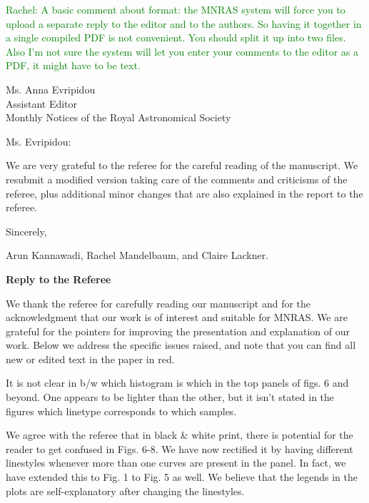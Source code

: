 \documentclass[english]{letter}
\newcommand{\rachel}[1]{\textrm{\textcolor{green}{Rachel: #1}}}
\begin{document}
\date{\today}

\rachel{A basic comment about format: the MNRAS system will force you to upload a separate reply to
  the editor and to the authors.  So having it together in a single compiled PDF is not convenient.
  You should split it up into two files.  Also I'm not sure the system will let you enter your
  comments to the editor as a PDF, it might have to be text.}

\begin{letter}{Ms. Anna Evripidou\\ Assistant Editor\\ Monthly Notices of the 
Royal Astronomical Society}

\opening{Ms. Evripidou:}

We are very grateful to the referee for the careful reading of the manuscript.
We resubmit a modified version taking care of the comments and criticisms of the referee, plus
additional minor changes that are also explained in the report to the referee.

\closing{Sincerely,}
Arun Kannawadi, Rachel Mandelbaum, and Claire Lackner.
\end{letter}
\vspace{20pt}
{\bf Reply to the Referee}

We thank the referee for carefully reading our manuscript and for the acknowledgment that our work is of interest
and suitable for MNRAS. We are grateful for the pointers for improving the presentation and
explanation of our work. 
Below we address the specific issues raised, and note that you can find all new or edited text in
the paper in red.

\begin{shaded}
It is not clear in b/w which histogram is which in the top panels of figs. 6 and beyond. One appears to be lighter than the other, but it isn't stated in the figures which linetype corresponds to which samples.
\end{shaded}
\noindent
We agree with the referee that in black \& white print, there is potential for the reader to get confused in Figs. 6-8.
We have now rectified it by having different linestyles whenever more than one curves are present in the panel. In fact, we have extended this to Fig. 1 to Fig. 5 as well. We believe that the legends in the plots are self-explanatory after changing the linestyles.
\end{document}
